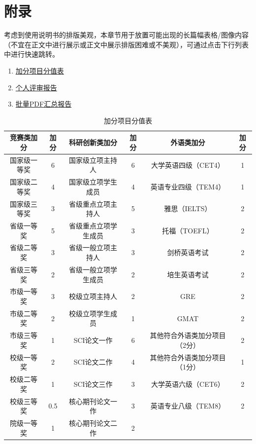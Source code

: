 \chapter{附录}
考虑到使用说明书的排版美观，本章节用于放置可能出现的长篇幅表格/图像内容（不宜在正文中进行展示或正文中展示排版困难或不美观），可通过点击下行列表中进行快速跳转。

\begin{enumerate}
	\item \hyperref[分值表]{加分项目分值表}
	\item \hyperref[个人评审报告]{个人评审报告}
	\item \hyperref[批量PDF汇总报告]{批量PDF汇总报告}
\end{enumerate}


\begin{table}[htbp]
	\centering
	\small
	\renewcommand{\arraystretch}{1} %
	\caption{加分项目分值表}
	\begin{tabular}{cccccc}
		\toprule%
		\textbf{竞赛类加分} & \textbf{加分} & \textbf{科研创新类加分} & \textbf{加分} & \textbf{外语类加分} & \textbf{加分} \\  \midrule%
		国家级一等奖 & 6 & 国家级立项主持人 & 6 & 大学英语四级（CET4） & 1 \\ 
		国家级二等奖 & 4 & 国家级立项学生成员 & 4 & 英语专业四级（TEM4） & 1 \\ 
		国家级三等奖 & 3 & 省级重点立项主持人 & 5 & 雅思（IELTS） & 2 \\ 
		省级一等奖 & 5 & 省级重点立项学生成员 & 3 & 托福（TOEFL） & 2 \\ 
		省级二等奖 & 3 & 省级一般立项主持人 & 3 & 剑桥英语考试 & 2 \\ 
		省级三等奖 & 2 & 省级一般立项学生成员 & 2 & 培生英语考试 & 2 \\
		市级一等奖 & 3 & 校级立项主持人 & 2 & GRE & 2 \\ 
		市级二等奖 & 2 & 校级立项学生成员 & 1 & GMAT & 2 \\ 
		市级三等奖 & 1 & SCI论文一作 & 6 & 其他符合外语类加分项目（2分） & 2 \\
		校级一等奖 & 2 & SCI论文二作 & 4 & 其他符合外语类加分项目（1分） & 1 \\
		校级二等奖 & 1 & SCI论文三作 & 3 & 大学英语六级（CET6） & 2 \\ 
		校级三等奖 & 0.5 & 核心期刊论文一作 & 3 & 英语专业八级（TEM8） & 2 \\ 
		院级一等奖 & 1 & 核心期刊论文二作 & 2 & & \\ 

\end{tabular}
\end{table}
